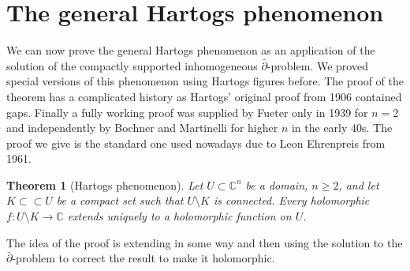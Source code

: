 \documentclass[12pt,openany]{book}
\newcommand{\C}{{\mathbb{C}}}
\theoremstyle{plain}
\newtheorem{thm}{Theorem}[section]
\theoremstyle{remark}
\theoremstyle{definition}
\theoremstyle{exercise}
\theoremstyle{example}
\begin{document}
\section{The general Hartogs phenomenon}

We can now prove the general Hartogs phenomenon as an application of the
solution of the compactly supported
inhomogeneous $\bar{\partial}$-problem.  We proved special
versions of this phenomenon using Hartogs figures before.
The proof of the theorem has a complicated history as
Hartogs' original proof from 1906 contained gaps.
Finally a fully working proof was supplied by Fueter only in 1939 for $n=2$
and independently by Bochner and Martinelli for higher $n$
in the early 40s. 
The proof we give is the
standard one used nowadays due to Leon Ehrenpreis from 1961.

\begin{thm}[Hartogs phenomenon]
Let $U \subset \C^n$ be a domain, $n \geq 2$, and let
$K \subset \subset U$ be a compact set such that
$U \setminus K$ is connected.  Every holomorphic $f \colon U \setminus K \to \C$
extends uniquely to a holomorphic function on $U$.
\end{thm}

\begin{center}

\end{center}

The idea of the proof is extending in some way and then using the solution
to the $\bar{\partial}$-problem to correct the result to make it
holomorphic.
\end{document}

